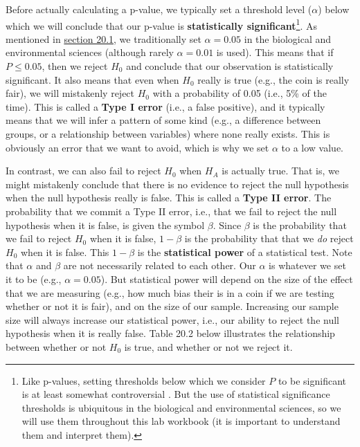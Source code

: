 \documentclass[
]{scrbook}
\begin{document}
Before actually calculating a p-value, we typically set a threshold level (\(\alpha\)) below which we will conclude that our p-value is \textbf{statistically significant}\footnote{Like p-values, setting thresholds below which we consider \(P\) to be significant is at least somewhat controversial \citep{McShane2019, Mayo2021}. But the use of statistical significance thresholds is ubiquitous in the biological and environmental sciences, so we will use them throughout this lab workbook (it is important to understand them and interpret them).}.
As mentioned in \protect\hyperlink{how-ridiculous-is-our-hypothesis}{section 20.1}, we traditionally set \(\alpha= 0.05\) in the biological and environmental sciences (although rarely \(\alpha = 0.01\) is used).
This means that if \(P \leq 0.05\), then we reject \(H_{0}\) and conclude that our observation is statistically significant.
It also means that even when \(H_{0}\) really is true (e.g., the coin is really fair), we will mistakenly reject \(H_{0}\) with a probability of 0.05 (i.e., 5\% of the time).
This is called a \textbf{Type I error} (i.e., a false positive), and it typically means that we will infer a pattern of some kind (e.g., a difference between groups, or a relationship between variables) where none really exists.
This is obviously an error that we want to avoid, which is why we set \(\alpha\) to a low value.

In contrast, we can also fail to reject \(H_{0}\) when \(H_{A}\) is actually true.
That is, we might mistakenly conclude that there is no evidence to reject the null hypothesis when the null hypothesis really is false.
This is called a \textbf{Type II error}.
The probability that we commit a Type II error, i.e., that we fail to reject the null hypothesis when it is false, is given the symbol \(\beta\).
Since \(\beta\) is the probability that we fail to reject \(H_{0}\) when it is false, \(1 - \beta\) is the probability that that we \emph{do} reject \(H_{0}\) when it is false.
This \(1 - \beta\) is the \textbf{statistical power} of a statistical test.
Note that \(\alpha\) and \(\beta\) are not necessarily related to each other.
Our \(\alpha\) is whatever we set it to be (e.g., \(\alpha = 0.05\)).
But statistical power will depend on the size of the effect that we are measuring (e.g., how much bias their is in a coin if we are testing whether or not it is fair), and on the size of our sample.
Increasing our sample size will always increase our statistical power, i.e., our ability to reject the null hypothesis when it is really false.
Table 20.2 below illustrates the relationship between whether or not \(H_{0}\) is true, and whether or not we reject it.
\end{document}
